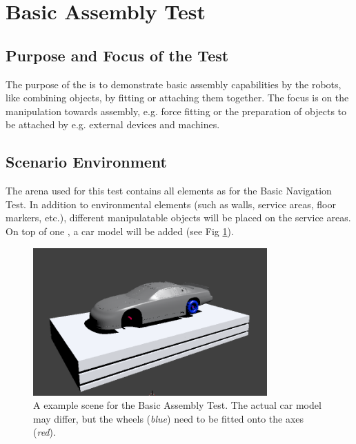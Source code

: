 \newpage
\section{Basic Assembly Test}

\subsection{Purpose and Focus of the Test}
The purpose of the  is to demonstrate basic assembly capabilities by the robots, like combining objects, by fitting or attaching them together.
The focus is on the manipulation towards assembly, e.g. force fitting or the preparation of objects to be attached by e.g. external devices and machines.


\subsection{Scenario Environment}
The arena used for this test contains  all elements as for the Basic Navigation Test. In addition to environmental elements (such as walls, service areas, floor markers, etc.), different manipulatable objects will be placed on the service areas. On top of one , a car model will be added (see Fig \ref{fig:BAT_car}).


\begin{figure} [h!]
\centering
\includegraphics[width=0.8\textwidth ]{./images/BAT.png}
\caption{A example scene for the Basic Assembly Test. The actual car model may differ, but the wheels (\emph{blue}) need to be fitted onto the axes (\emph{red}).}
\label{fig:BAT_car}
\end{figure}


